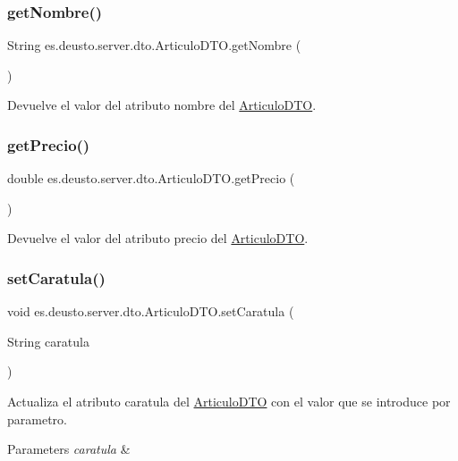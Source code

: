 \subsubsection{\texorpdfstring{getNombre()}{getNombre()}}
{\footnotesize\ttfamily String es.\+deusto.\+server.\+dto.\+Articulo\+D\+T\+O.\+get\+Nombre (\begin{DoxyParamCaption}{ }\end{DoxyParamCaption})}

Devuelve el valor del atributo nombre del \mbox{\hyperlink{classes_1_1deusto_1_1server_1_1dto_1_1_articulo_d_t_o}{Articulo\+D\+TO}}. \mbox{\label{classes_1_1deusto_1_1server_1_1dto_1_1_articulo_d_t_o_aaa5d33895a4ba9292afc8c8ad55f458f}} 
\subsubsection{\texorpdfstring{getPrecio()}{getPrecio()}}
{\footnotesize\ttfamily double es.\+deusto.\+server.\+dto.\+Articulo\+D\+T\+O.\+get\+Precio (\begin{DoxyParamCaption}{ }\end{DoxyParamCaption})}

Devuelve el valor del atributo precio del \mbox{\hyperlink{classes_1_1deusto_1_1server_1_1dto_1_1_articulo_d_t_o}{Articulo\+D\+TO}}. \mbox{\label{classes_1_1deusto_1_1server_1_1dto_1_1_articulo_d_t_o_a844cc9d811afd3a03ae598f462318d8c}} 
\subsubsection{\texorpdfstring{setCaratula()}{setCaratula()}}
{\footnotesize\ttfamily void es.\+deusto.\+server.\+dto.\+Articulo\+D\+T\+O.\+set\+Caratula (\begin{DoxyParamCaption}\item[{String}]{caratula }\end{DoxyParamCaption})}

Actualiza el atributo caratula del \mbox{\hyperlink{classes_1_1deusto_1_1server_1_1dto_1_1_articulo_d_t_o}{Articulo\+D\+TO}} con el valor que se introduce por parametro. 
\begin{DoxyParams}{Parameters}
{\em caratula} & \\
\hline
\end{DoxyParams}
\mbox{\label{classes_1_1deusto_1_1server_1_1dto_1_1_articulo_d_t_o_a73d6bb2d7de2b080f12a2fa47642adae}} 
